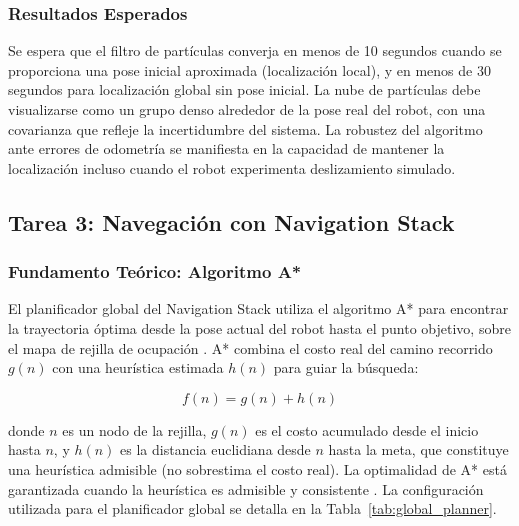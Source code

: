 \documentclass[12pt,letterpaper]{article}
\begin{document}
\subsubsection{Resultados Esperados}

Se espera que el filtro de partículas converja en menos de 10 segundos cuando se proporciona una pose inicial aproximada (localización local), y en menos de 30 segundos para localización global sin pose inicial. La nube de partículas debe visualizarse como un grupo denso alrededor de la pose real del robot, con una covarianza que refleje la incertidumbre del sistema. La robustez del algoritmo ante errores de odometría se manifiesta en la capacidad de mantener la localización incluso cuando el robot experimenta deslizamiento simulado.

\subsection{Tarea 3: Navegación con Navigation Stack}
\label{sec:navstack}

\subsubsection{Fundamento Teórico: Algoritmo A*}

El planificador global del Navigation Stack utiliza el algoritmo A* para encontrar la trayectoria óptima desde la pose actual del robot hasta el punto objetivo, sobre el mapa de rejilla de ocupación \citep{hart1968formal}. A* combina el costo real del camino recorrido $g(n)$ con una heurística estimada $h(n)$ para guiar la búsqueda:

\begin{equation}
    f(n) = g(n) + h(n)
    \label{eq:astar}
\end{equation}

donde $n$ es un nodo de la rejilla, $g(n)$ es el costo acumulado desde el inicio hasta $n$, y $h(n)$ es la distancia euclidiana desde $n$ hasta la meta, que constituye una heurística admisible (no sobrestima el costo real). La optimalidad de A* está garantizada cuando la heurística es admisible y consistente \citep{hart1968formal}. La configuración utilizada para el planificador global se detalla en la Tabla~\ref{tab:global_planner}.
\end{document}
